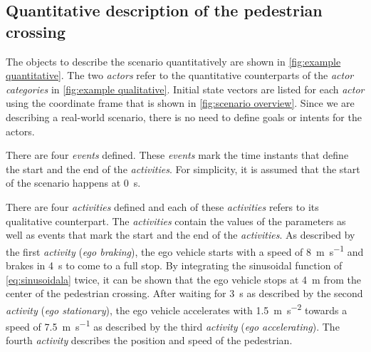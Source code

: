 \subsection{Quantitative description of the pedestrian crossing}
\label{sec:example quantitative}

The objects to describe the scenario quantitatively are shown in \cref{fig:example quantitative}. The two \textit{actors} refer to the quantitative counterparts of the \textit{actor categories} in \cref{fig:example qualitative}. Initial state vectors are listed for each \textit{actor} using the coordinate frame that is shown in \cref{fig:scenario overview}. 
Since we are describing a real-world scenario, there is no need to define \cstarte goals or intents \cende for the actors.


\begin{figure*}[t]
	\centering
	
	\caption{The objects that are used to quantitatively describe the scenario that is schematically shown in \cref{fig:scenario overview}. For the sake of brevity, the tags and the unique ID of each object are omitted.}
	\label{fig:example quantitative}
\end{figure*}

\cstartb There are four \textit{events} defined. These \textit{events} mark the time instants that define the start and the end of the \textit{activities}. For simplicity, it is assumed that the start of the scenario happens at \SI{0}{\second}. \cendb

There are four \textit{activities} defined and each of these \textit{activities} refers to its qualitative counterpart.
The \textit{activities} contain the values of the parameters as well as \cstartb events that mark the start and the end of the \textit{activities}\cendb. 
As described by the first \textit{activity} (\emph{ego braking}), the ego vehicle starts with a speed of \SI{8}{\meter\per\second} and brakes in \SI{4}{\second} to come to a full stop. By integrating the sinusoidal function of \cref{eq:sinusoidala} twice, it can be shown that the ego vehicle stops at \SI{4}{\meter} from the center of the pedestrian crossing. 
After waiting for \SI{3}{\second} \cstarte as described by \cende the second \textit{activity} (\emph{ego stationary}), the ego vehicle accelerates with \SI{1.5}{\meter\per\second\squared} towards a speed of \SI{7.5}{\meter\per\second} \cstarte as described by \cende the third \textit{activity} (\emph{ego accelerating}). 
The fourth \textit{activity} describes the position \cstarte and speed \cende of the pedestrian.

